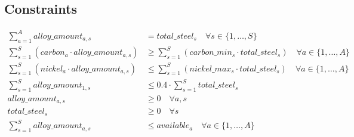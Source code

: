 \documentclass{article}
\begin{document}
\subsection*{Constraints}
\begin{align}
    \sum_{a=1}^{A} alloy\_amount_{a,s} & = total\_steel_{s} \quad \forall s \in \{1, \ldots, S\} \tag{1} \\
    \sum_{s=1}^{S} (carbon_{a} \cdot alloy\_amount_{a,s}) & \geq \sum_{s=1}^{S} (carbon\_min_{s} \cdot total\_steel_{s}) \quad \forall a \in \{1, \ldots, A\} \tag{2} \\
    \sum_{s=1}^{S} (nickel_{a} \cdot alloy\_amount_{a,s}) & \leq \sum_{s=1}^{S} (nickel\_max_{s} \cdot total\_steel_{s}) \quad \forall a \in \{1, \ldots, A\} \tag{3} \\
    \sum_{s=1}^{S} alloy\_amount_{1,s} & \leq 0.4 \cdot \sum_{s=1}^{S} total\_steel_{s} \tag{4} \\
    alloy\_amount_{a,s} & \geq 0 \quad \forall a, s \tag{5} \\
    total\_steel_{s} & \geq 0 \quad \forall s \tag{6} \\
    \sum_{s=1}^{S} alloy\_amount_{a,s} & \leq available_a \quad \forall a \in \{1, \ldots, A\} \tag{7}
\end{align}
\end{document}
